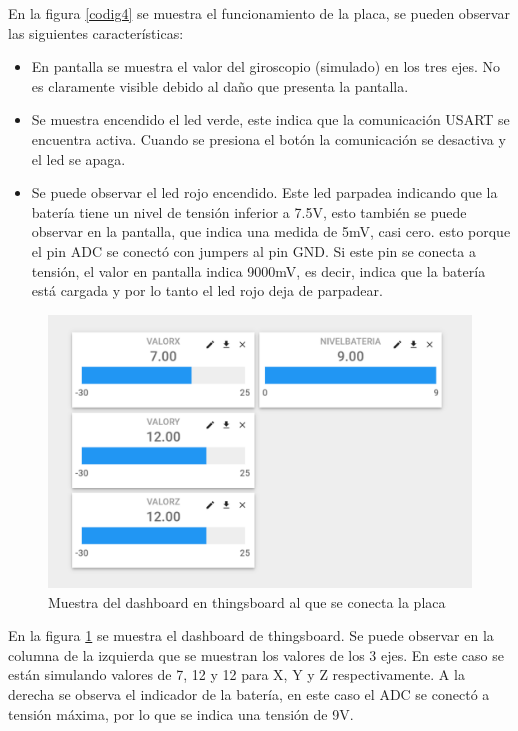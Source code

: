 En la figura \ref{codig4} se muestra el funcionamiento de la placa, se pueden observar las siguientes características:
\begin{itemize}
    \item En pantalla se muestra el valor del giroscopio (simulado) en los tres ejes. No es claramente visible debido al daño que presenta la pantalla.
    \item Se muestra encendido el led verde, este indica que la comunicación USART se encuentra activa. Cuando se presiona el botón la comunicación se desactiva y el led se apaga.
    \item  Se puede observar el led rojo encendido. Este led parpadea indicando que la batería tiene un nivel de tensión inferior a 7.5V, esto también se puede observar en la pantalla, que indica una medida de 5mV, casi cero. esto porque el pin ADC se conectó con jumpers al pin GND. Si este pin se conecta a tensión, el valor en pantalla indica 9000mV, es decir, indica que la batería está cargada y por lo tanto el led rojo deja de parpadear.
\end{itemize}
\begin{figure}[H]
    \centering
    \includegraphics[scale=.3]{Imagenes/TB.png}
    \caption{Muestra del dashboard en thingsboard al que se conecta la placa}
    \label{TB}
\end{figure}
En la figura \ref{TB} se muestra el dashboard de thingsboard. Se puede observar en la columna de la izquierda que se muestran los valores de los 3 ejes. En este caso se están simulando valores de 7, 12 y 12 para X, Y y Z respectivamente. A la derecha se observa el indicador de la batería, en este caso el ADC se conectó a tensión máxima, por lo que se indica una tensión de 9V.






